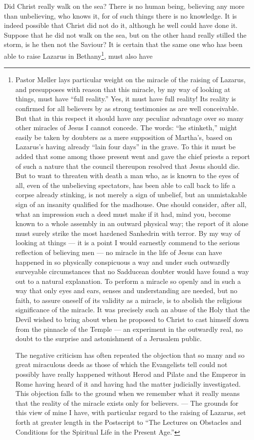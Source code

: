 \documentclass[12pt,a4paper,openany]{book}
\newcommand{\opage}[1]{\marginnote{\footnotesize\textit{[#1]}}}
\begin{document}
Did Christ really walk on the sea? There is
no human being, believing any more than unbelieving, who
knows it, for of such things there is no knowledge. It is indeed
possible that Christ did not do it, although he well
could have done it. Suppose that he did not walk on the
sea, but on the other hand really stilled the storm, is he then
not the Saviour? It is certain that the same one who has
\setcounter{footnote}{0}%
\opage{24}been able to raise Lazarus in Bethany\footnote[1]{Pastor Møller lays particular weight on the miracle of the raising of Lazarus, and presupposes with reason that this miracle, by my way of looking at things, must have ``full reality.'' Yes, it must have full reality! Its reality is confirmed for all believers by as strong testimonies as are well conceivable. But that in this respect it should have any peculiar advantage over so many other miracles of Jesus I cannot concede. The words: ``he stinketh,'' might easily be taken by doubters as a mere supposition of Martha's, based on Lazarus's having already ``lain four days'' in the grave. To this it must be added that some among those present went and gave the chief priests a report of such a nature that the council thereupon resolved that Jesus should die. But to want to threaten with death a man who, as is known to the eyes of all, even of the unbelieving spectators, has been able to call back to life a corpse already stinking, is not merely a sign of unbelief, but an unmistakable sign of an insanity qualified for the madhouse. One should consider, after all, what an impression such a deed must make if it had, mind you, become known to a whole assembly in an outward physical way; the report of it alone must surely strike the most hardened Sanhedrin with terror. By my way of looking at things --- it is a point I would earnestly commend to the serious reflection of believing men --- no miracle in the life of Jesus can have happened in so physically conspicuous a way and under such outwardly surveyable circumstances that no Sadducean doubter would have found a way out to a natural explanation. To perform a miracle so openly and in such a way that only eyes and ears, senses and understanding are needed, but no faith, to assure oneself of its validity as a miracle, is to abolish the religious significance of the miracle. It was precisely such an abuse of the Holy that the Devil wished to bring about when he proposed to Christ to cast himself down from the pinnacle of the Temple --- an experiment in the outwardly real, no doubt to the surprise and astonishment of a Jerusalem public.\par The negative criticism has often repeated the objection that so many and so great miraculous deeds as those of which the Evangelists tell could not possibly have really happened without Herod and Pilate and the Emperor in Rome having heard of it and having had the matter judicially investigated. This objection falls to the ground when we remember what it really means that the reality of the miracle exists only for believers. --- The grounds for this view of mine I have, with particular regard to the raising of Lazarus, set forth at greater length in the Postscript to ``The Lectures on Obstacles and Conditions for the Spiritual Life in the Present Age.''}, must also have
\end{document}
